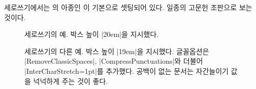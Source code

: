 \documentclass[a4paper]{article}
\begin{document}
세로쓰기에서는 의 아종인 이
기본으로 셋팅되어 있다. 일종의 고문헌 조판으로 보는 것이다.

\begin{figure}
\caption{세로쓰기의 예. 박스 높이 |20em|을 지시했다.}\label{fig:vertical}
\end{figure}

\begin{figure}
\caption{세로쓰기의 다른 예. 박스 높이 |19em|을 지시했다.
  글꼴옵션은 |RemoveClassicSpaces|, |CompressPunctuations|와 더불어
  |InterCharStretch=1pt|를 추가했다. 공백이 없는 문서는 자간늘이기 값을
  넉넉하게 주는 것이 좋다.}\label{fig:vertical3}
\end{figure}
\end{document}
